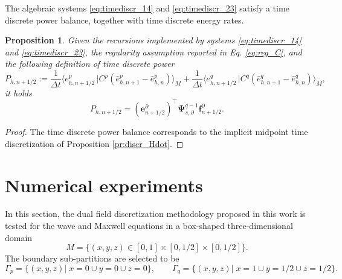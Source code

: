 \documentclass{elsarticle}
\newtheorem{proposition}{Proposition}
\newcommand*{\dual}[1]{\ensuremath{\widehat{#1}}}
\newcommand{\dualpr}[3][]{\ensuremath{\langle #2 \, \vert #3 \rangle_{#1}}}
\begin{document}
The algebraic systems \eqref{eq:timediscr_14} and \eqref{eq:timediscr_23} satisfy a time discrete power balance, together with time discrete energy rates.
\begin{proposition}\label{pr:discrtime_Hdot}
Given the recursions implemented by systems \eqref{eq:timediscr_14} and \eqref{eq:timediscr_23}, the regularity assumption reported in Eq. \eqref{eq:reg_C}, and the following definition of time discrete power
\begin{equation*}
    P_{h, n+1/2} := \frac{1}{\Delta t}\dualpr[M]{e^p_{h, n+1/2}}{C^p (\dual{e}^p_{h, n+1}- \dual{e}^p_{h, n})} + \frac{1}{\Delta t}\dualpr[M]{e^q_{h, n+1/2}}{C^q (\dual{e}^q_{h, n+1}-\dual{e}^q_{h, n})},
\end{equation*}
it holds
\begin{equation}
    P_{h, n+1/2} = (\mathbf{e}^\partial_{n+1/2})^\top \mathbf{\Psi}^{q-1}_{s, \partial}\mathbf{f}^\partial_{n+1/2}.
\end{equation}
\end{proposition}
\begin{proof}
The time discrete power balance corresponds to the implicit midpoint time discretization of Proposition \ref{pr:discr_Hdot}.
\end{proof}

\section{Numerical experiments}\label{sec:num_exp}

In this section, the dual field discretization methodology proposed in this work is tested for the wave and Maxwell equations in a box-shaped three-dimensional domain
$$M = \{ (x,y,z) \in [0, 1]\times[0, 1/2]\times[0, 1/2] \}.$$ 
The boundary sub-partitions are selected to be
\begin{equation*}
    \Gamma_p = \{(x,y,z) \vert \; x=0 \cup y=0 \cup z=0\}, \qquad \Gamma_q = \{(x, y, z) \vert \; x=1 \cup y=1/2 \cup z=1/2 \}.
\end{equation*}
\end{document}
